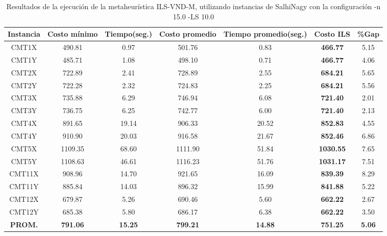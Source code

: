 \begin{table}[h]
\caption{Resultados de la ejecución de la metaheurística ILS-VND-M, utilizando instancias de SalhiNagy con la configuración -n 15.0 -LS 10.0}
\centering
\small
\begin{tabular}{c c c c c c c}
\hline\hline
Instancia & Costo mínimo & Tiempo(seg.) & Costo promedio & Tiempo promedio(seg.) & Costo ILS & \%Gap \\ [0.5ex]
\hline
CMT1X & 490.81 & 0.97 & 
501.76 & 0.83 & \bf{466.77} & 
5.15\\CMT1Y & 485.71 & 1.08 & 
498.10 & 0.71 & \bf{466.77} & 
4.06\\CMT2X & 722.89 & 2.41 & 
728.89 & 2.55 & \bf{684.21} & 
5.65\\CMT2Y & 722.28 & 2.32 & 
724.83 & 2.25 & \bf{684.21} & 
5.56\\CMT3X & 735.88 & 6.29 & 
746.94 & 6.08 & \bf{721.40} & 
2.01\\CMT3Y & 736.75 & 6.25 & 
742.77 & 6.00 & \bf{721.40} & 
2.13\\CMT4X & 891.65 & 19.14 & 
906.33 & 20.52 & \bf{852.83} & 
4.55\\CMT4Y & 910.90 & 20.03 & 
916.58 & 21.67 & \bf{852.46} & 
6.86\\CMT5X & 1109.35 & 68.60 & 
1111.90 & 51.84 & \bf{1030.55} & 
7.65\\CMT5Y & 1108.63 & 46.61 & 
1116.23 & 51.76 & \bf{1031.17} & 
7.51\\CMT11X & 908.96 & 14.70 & 
921.65 & 16.09 & \bf{839.39} & 
8.29\\CMT11Y & 885.84 & 14.03 & 
896.32 & 15.99 & \bf{841.88} & 
5.22\\CMT12X & 679.87 & 5.26 & 
690.46 & 5.60 & \bf{662.22} & 
2.67\\CMT12Y & 685.38 & 5.80 & 
686.17 & 6.38 & \bf{662.22} & 
3.50\\\bf{PROM.} & 
\bf{791.06} & \bf{15.25} & \bf{799.21} & \bf{14.88} & \bf{751.25} & \bf{5.06}\\[1ex]\hline
\end{tabular}
\label{table:ILS-VND-M-15-10-S}
\end{table}

